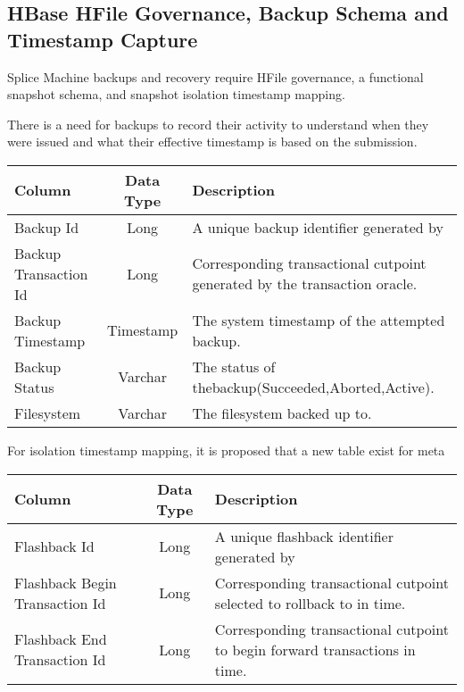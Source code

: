 \subsection{HBase HFile Governance, Backup Schema and Timestamp Capture}

Splice Machine backups and recovery require HFile governance, a functional
snapshot schema, and snapshot isolation timestamp mapping.

There is a need for backups to record their activity to understand when they
were issued and what their effective timestamp is based on the submission.
 
\begin{center}
\begin{tabular}{|l|c|p{5cm}|}
				\hline
				\bf{Column}							&	\bf{Data Type}	&	\bf{Description} \\ \hline
				Backup Id							&	Long			&	A unique backup identifier generated by \\ \hline 
				Backup Transaction Id				& 	Long			& 	Corresponding
				transactional cutpoint generated by the transaction oracle. \\ \hline 
				Backup Timestamp				   &	Timestamp		&	The system timestamp of
				the attempted backup.
				\\
				\hline 
				Backup Status						&	Varchar			& 	The status of
				thebackup(Succeeded,Aborted,Active).
				\\
				\hline
				Filesystem						&	Varchar			& 	The filesystem backed up to.
				\\
				\hline

\end{tabular}
\end{center}


For isolation timestamp mapping, it is proposed that a new table exist for meta


\begin{center}
\begin{tabular}{|l|c|p{5cm}|}
				\hline
				\bf{Column}							&	\bf{Data Type}	&	\bf{Description} \\ \hline
				Flashback Id							&	Long			&	A unique flashback identifier generated by \\
				\hline 
				Flashback Begin Transaction Id				& 	Long			& 	Corresponding
				transactional cutpoint selected to rollback to in time. \\ \hline 
				Flashback End Transaction Id				& 	Long			& 	Corresponding
				transactional cutpoint to begin forward transactions in time. \\
				\hline 
\end{tabular}
\end{center}

